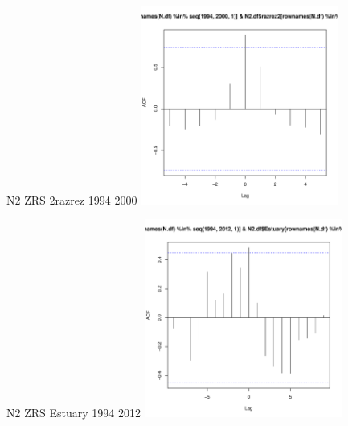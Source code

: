 \documentclass[12pt, a4paper]{disser}
\begin{document}
\begin{figure}[ht]
	\begin{minipage}[b]{.46\linewidth}
	\begin{center}
	{\tiny   N2 ZRS 2razrez 1994 2000}
	\includegraphics[width=65mm]{../White_Sea/dynamic_N_N1/crosscorr_N2_ZRS_2razrez_1994_2000.pdf}
	\end{center}
	\end{minipage}
%
	\hfil %
%
	\begin{minipage}[b]{.46\linewidth}
	\begin{center}	
	{\tiny  N2 ZRS Estuary 1994 2012}
	\includegraphics[width=65mm]{../White_Sea/dynamic_N_N1/crosscorr_N2_ZRS_Estuary_1994_2012.pdf}
	\end{center}
	\end{minipage}



\end{figure}
\end{document}
